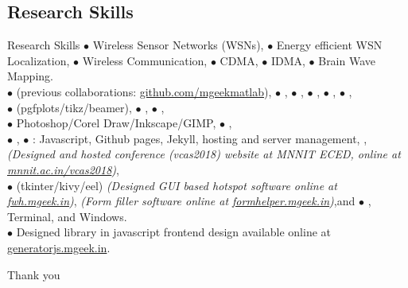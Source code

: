 \subsection{Research Skills }
\begin{frame}[allowframebreaks]{Research Skills }{}
{\scriptsize$\bullet$} Wireless Sensor Networks (WSNs), {\scriptsize$\bullet$} Energy efficient WSN Localization, {\scriptsize$\bullet$} Wireless Communication, {\scriptsize$\bullet$} CDMA, {\scriptsize$\bullet$} IDMA, {\scriptsize$\bullet$} Brain Wave Mapping.\\
{\scriptsize$\bullet$}  (previous collaborations: \href{https://github.com/mgeekmatlab}{github.com/mgeekmatlab}), {\scriptsize$\bullet$} , {\scriptsize$\bullet$} , {\scriptsize$\bullet$} , {\scriptsize$\bullet$} , {\scriptsize$\bullet$} ,\\ 
{\scriptsize$\bullet$}  (pgfplots/tikz/beamer), {\scriptsize$\bullet$} , {\scriptsize$\bullet$} ,\\
{\scriptsize$\bullet$} Photoshop/Corel Draw/Inkscape/GIMP, {\scriptsize$\bullet$} , \\
{\scriptsize$\bullet$} , {\scriptsize$\bullet$} : Javascript, Github pages, Jekyll, hosting and server management, ,  \emph{(Designed and hosted conference (vcas2018) website at MNNIT ECED, online at \href{http://mnnit.ac.in/vcas2018}{mnnit.ac.in/vcas2018})}, \\
{\scriptsize$\bullet$}  (tkinter/kivy/eel) \emph{(Designed GUI based hotspot software online at \href{https://fwh.mgeek.in}{fwh.mgeek.in})}, \emph{(Form filler software online at \href{https://formhelper.mgeek.in}{formhelper.mgeek.in})},and {\scriptsize$\bullet$} , Terminal, and Windows.\\ {\scriptsize$\bullet$} Designed  library in javascript frontend design available online at \href{https://generatorjs.mgeek.in}{generatorjs.mgeek.in}.\\

\end{frame}


\begin{frame}[plain]{}{}
\begin{center}
\vfill
\Huge{
Thank you
}
\vfill
\end{center}
\end{frame}
\nocite{*}

